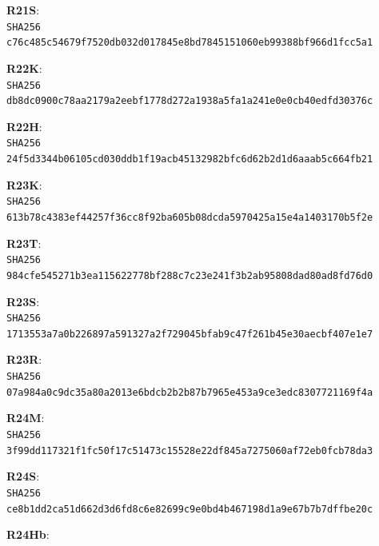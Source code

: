 \documentclass[11pt,a4paper]{article}
\begin{document}
\textbf{R21S}: \\
\texttt{SHA256 c76c485c54679f7520db032d017845e8\allowbreak bd7845151060eb99388bf966d1fcc5a1}\par\medskip
\textbf{R22K}: \\
\texttt{SHA256 db8dc0900c78aa2179a2eebf1778d272\allowbreak a1938a5fa1a241e0e0cb40edfd30376c}\par\medskip
\textbf{R22H}: \\
\texttt{SHA256 24f5d3344b06105cd030ddb1f19acb45\allowbreak 132982bfc6d62b2d1d6aaab5c664fb21}\par\medskip
\textbf{R23K}: \\
\texttt{SHA256 613b78c4383ef44257f36cc8f92ba605\allowbreak b08dcda5970425a15e4a1403170b5f2e}\par\medskip
\textbf{R23T}: \\
\texttt{SHA256 984cfe545271b3ea115622778bf288c7\allowbreak c23e241f3b2ab95808dad80ad8fd76d0}\par\medskip
\textbf{R23S}: \\
\texttt{SHA256 1713553a7a0b226897a591327a2f7290\allowbreak 45bfab9c47f261b45e30aecbf407e1e7}\par\medskip
\textbf{R23R}: \\
\texttt{SHA256 07a984a0c9dc35a80a2013e6bdcb2b2b\allowbreak 87b7965e453a9ce3edc8307721169f4a}\par\medskip
\textbf{R24M}: \\
\texttt{SHA256 3f99dd117321f1fc50f17c51473c1552\allowbreak 8e22df845a7275060af72eb0fcb78da3}\par\medskip
\textbf{R24S}: \\
\texttt{SHA256 ce8b1dd2ca51d662d3d6fd8c6e82699c\allowbreak 9e0bd4b467198d1a9e67b7b7dffbe20c}\par\medskip
\textbf{R24Hb}: \\
\end{document}
